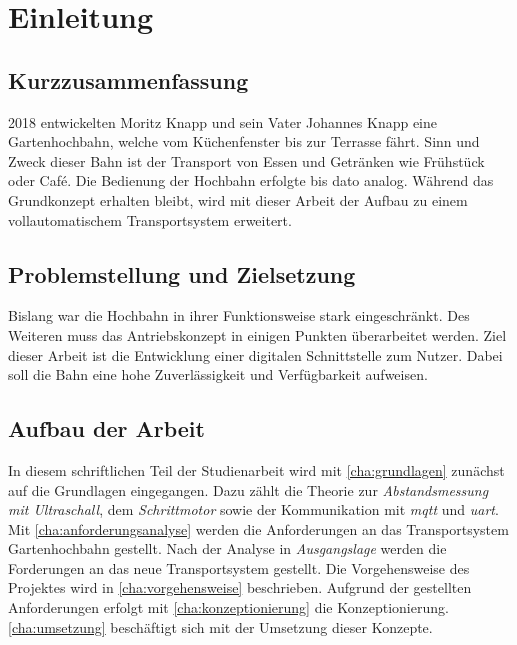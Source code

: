 
\chapter{Einleitung}

\section{Kurzzusammenfassung}
2018 entwickelten Moritz Knapp und sein Vater Johannes Knapp eine Gartenhochbahn, welche vom Küchenfenster bis zur Terrasse fährt. 
Sinn und Zweck dieser Bahn ist der Transport von Essen und Getränken wie Frühstück oder Café. Die Bedienung der Hochbahn erfolgte bis dato analog. Während das Grundkonzept erhalten bleibt, wird mit dieser Arbeit der Aufbau zu einem vollautomatischem Transportsystem erweitert.

\section{Problemstellung und Zielsetzung}
    
Bislang war die Hochbahn in ihrer Funktionsweise stark eingeschränkt. Des Weiteren muss das Antriebskonzept in einigen Punkten überarbeitet werden. Ziel dieser Arbeit ist die Entwicklung einer digitalen Schnittstelle zum Nutzer. Dabei soll die Bahn eine hohe Zuverlässigkeit und Verfügbarkeit aufweisen. 
\newpage

\section{Aufbau der Arbeit}
In diesem schriftlichen Teil der Studienarbeit wird mit \autoref{cha:grundlagen} zunächst auf die Grundlagen eingegangen. Dazu zählt die Theorie zur \textit{Abstandsmessung mit Ultraschall}, dem \textit{Schrittmotor} sowie der Kommunikation mit \textit{\acrshort{mqtt}} und \textit{\acrshort{uart}}. 
Mit \autoref{cha:anforderungsanalyse} werden die Anforderungen an das Transportsystem Gartenhochbahn gestellt. Nach der Analyse in \textit{Ausgangslage} werden die Forderungen an das neue Transportsystem gestellt. Die Vorgehensweise des Projektes wird in \autoref{cha:vorgehensweise} beschrieben. Aufgrund der gestellten Anforderungen erfolgt mit \autoref{cha:konzeptionierung} die Konzeptionierung. \autoref{cha:umsetzung} beschäftigt sich mit der Umsetzung dieser Konzepte. 
 




